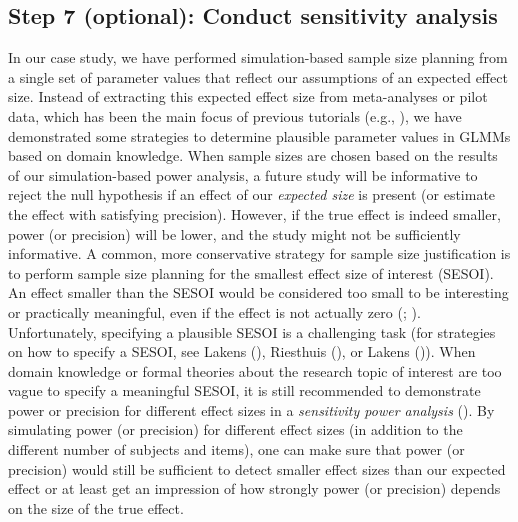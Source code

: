 \documentclass[
  man,
  floatsintext,
  longtable,
  a4paper,
  nolmodern,
  notxfonts,
  notimes,
  colorlinks=true,linkcolor=blue,citecolor=blue,urlcolor=blue]{apa7}
\begin{document}
\subsection{Step 7 (optional): Conduct sensitivity
analysis}\label{step-7-optional-conduct-sensitivity-analysis}

In our case study, we have performed simulation-based sample size
planning from a single set of parameter values that reflect our
assumptions of an expected effect size. Instead of extracting this
expected effect size from meta-analyses or pilot data, which has been
the main focus of previous tutorials (e.g.,
),
we have demonstrated some strategies to determine plausible parameter
values in GLMMs based on domain knowledge. When sample sizes are chosen
based on the results of our simulation-based power analysis, a future
study will be informative to reject the null hypothesis if an effect of
our \emph{expected size} is present (or estimate the effect with
satisfying precision). However, if the true effect is indeed smaller,
power (or precision) will be lower, and the study might not be
sufficiently informative. A common, more conservative strategy for
sample size justification is to perform sample size planning for the
smallest effect size of interest (SESOI). An effect smaller than the
SESOI would be considered too small to be interesting or practically
meaningful, even if the effect is not actually zero
(;
). Unfortunately, specifying a plausible SESOI is a
challenging task (for strategies on how to specify a SESOI, see Lakens
(), Riesthuis
(), or
Lakens ()). When
domain knowledge or formal theories about the research topic of interest
are too vague to specify a meaningful SESOI, it is still recommended to
demonstrate power or precision for different effect sizes in a
\emph{sensitivity power analysis}
(). By
simulating power (or precision) for different effect sizes (in addition
to the different number of subjects and items), one can make sure that
power (or precision) would still be sufficient to detect smaller effect
sizes than our expected effect or at least get an impression of how
strongly power (or precision) depends on the size of the true effect.
\end{document}
